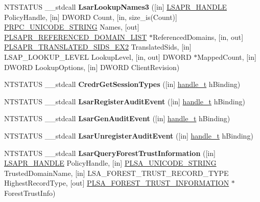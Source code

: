 \begin{DoxyCompactItemize}
N\+T\+S\+T\+A\+T\+US \+\_\+\+\_\+stdcall {\bfseries Lsar\+Lookup\+Names3} (\mbox{[}in\mbox{]} \hyperlink{interfacevoid}{L\+S\+A\+P\+R\+\_\+\+H\+A\+N\+D\+LE} Policy\+Handle, \mbox{[}in\mbox{]} D\+W\+O\+RD Count, \mbox{[}in, size\+\_\+is(Count)\mbox{]} \hyperlink{struct___r_p_c___u_n_i_c_o_d_e___s_t_r_i_n_g}{P\+R\+P\+C\+\_\+\+U\+N\+I\+C\+O\+D\+E\+\_\+\+S\+T\+R\+I\+NG} Names, \mbox{[}out\mbox{]} \hyperlink{struct___l_s_a_p_r___r_e_f_e_r_e_n_c_e_d___d_o_m_a_i_n___l_i_s_t}{P\+L\+S\+A\+P\+R\+\_\+\+R\+E\+F\+E\+R\+E\+N\+C\+E\+D\+\_\+\+D\+O\+M\+A\+I\+N\+\_\+\+L\+I\+ST} $\ast$Referenced\+Domains, \mbox{[}in, out\mbox{]} \hyperlink{struct___l_s_a_p_r___t_r_a_n_s_l_a_t_e_d___s_i_d_s___e_x2}{P\+L\+S\+A\+P\+R\+\_\+\+T\+R\+A\+N\+S\+L\+A\+T\+E\+D\+\_\+\+S\+I\+D\+S\+\_\+\+E\+X2} Translated\+Sids, \mbox{[}in\mbox{]} L\+S\+A\+P\+\_\+\+L\+O\+O\+K\+U\+P\+\_\+\+L\+E\+V\+EL Lookup\+Level, \mbox{[}in, out\mbox{]} D\+W\+O\+RD $\ast$Mapped\+Count, \mbox{[}in\mbox{]} D\+W\+O\+RD Lookup\+Options, \mbox{[}in\mbox{]} D\+W\+O\+RD Client\+Revision)
\item 
\mbox{\label{interfacelsarpc_a13aa9954ab4b1dcd2f8bf2d5e3ded3ca}} 
N\+T\+S\+T\+A\+T\+US \+\_\+\+\_\+stdcall {\bfseries Credr\+Get\+Session\+Types} (\mbox{[}in\mbox{]} \hyperlink{interfacevoid}{handle\+\_\+t} h\+Binding)
\item 
\mbox{\label{interfacelsarpc_a46eb5084a11835bdbaf019f1e2f3adc1}} 
N\+T\+S\+T\+A\+T\+US \+\_\+\+\_\+stdcall {\bfseries Lsar\+Register\+Audit\+Event} (\mbox{[}in\mbox{]} \hyperlink{interfacevoid}{handle\+\_\+t} h\+Binding)
\item 
\mbox{\label{interfacelsarpc_aef808db7c050ca1272f54f17a1af3837}} 
N\+T\+S\+T\+A\+T\+US \+\_\+\+\_\+stdcall {\bfseries Lsar\+Gen\+Audit\+Event} (\mbox{[}in\mbox{]} \hyperlink{interfacevoid}{handle\+\_\+t} h\+Binding)
\item 
\mbox{\label{interfacelsarpc_a59ef5578d956f275adac738d80a3294b}} 
N\+T\+S\+T\+A\+T\+US \+\_\+\+\_\+stdcall {\bfseries Lsar\+Unregister\+Audit\+Event} (\mbox{[}in\mbox{]} \hyperlink{interfacevoid}{handle\+\_\+t} h\+Binding)
\item 
\mbox{\label{interfacelsarpc_ae8b9cc4ba8573a007463b439c60c4a12}} 
N\+T\+S\+T\+A\+T\+US \+\_\+\+\_\+stdcall {\bfseries Lsar\+Query\+Forest\+Trust\+Information} (\mbox{[}in\mbox{]} \hyperlink{interfacevoid}{L\+S\+A\+P\+R\+\_\+\+H\+A\+N\+D\+LE} Policy\+Handle, \mbox{[}in\mbox{]} \hyperlink{struct___l_s_a___u_n_i_c_o_d_e___s_t_r_i_n_g}{P\+L\+S\+A\+\_\+\+U\+N\+I\+C\+O\+D\+E\+\_\+\+S\+T\+R\+I\+NG} Trusted\+Domain\+Name, \mbox{[}in\mbox{]} L\+S\+A\+\_\+\+F\+O\+R\+E\+S\+T\+\_\+\+T\+R\+U\+S\+T\+\_\+\+R\+E\+C\+O\+R\+D\+\_\+\+T\+Y\+PE Highest\+Record\+Type, \mbox{[}out\mbox{]} \hyperlink{struct___l_s_a___f_o_r_e_s_t___t_r_u_s_t___i_n_f_o_r_m_a_t_i_o_n}{P\+L\+S\+A\+\_\+\+F\+O\+R\+E\+S\+T\+\_\+\+T\+R\+U\+S\+T\+\_\+\+I\+N\+F\+O\+R\+M\+A\+T\+I\+ON} $\ast$Forest\+Trust\+Info)

\end{DoxyCompactItemize}
